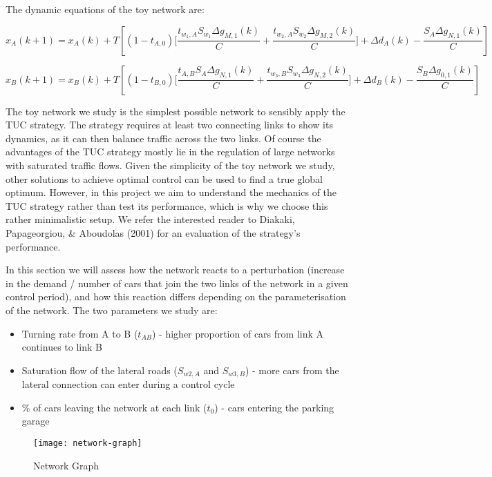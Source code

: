 \documentclass[11pt]{article}
\begin{document}
The dynamic equations of the toy network are:

\begin{equation}
x_{A}(k+1)=x_{A}(k)+T\left[\left(1-t_{A,0}\right)\bigg[\frac{t_{w_{1},A}S_{w_{1}}\Delta g_{M,1}(k)}{C}+\frac{t_{w_{2},A}S_{w_{2}}\Delta g_{M,2}(k)}{C}\bigg]+\Delta d_{A}(k)-\frac{S_{A}\Delta g_{N,1}(k)}{C}\right]
\end{equation}

\begin{equation}
x_{B}(k+1)=x_{B}(k)+T\left[\left(1-t_{B,0}\right)\bigg[\frac{t_{A,B}S_{A}\Delta g_{N,1}(k)}{C}+\frac{t_{w_{3},B}S_{w_{3}}\Delta g_{N,2}(k)}{C}\bigg]+\Delta d_{B}(k)-\frac{S_{B}\Delta g_{0,1}(k)}{C}\right]
\end{equation}


The toy network we study is the simplest possible network to sensibly apply the TUC strategy. The strategy requires at least two connecting links to show its dynamics, as it can then balance traffic across the two links. Of course the advantages of the TUC strategy mostly lie in the regulation of large networks with saturated traffic flows. Given the simplicity of the toy network we study, other solutions to achieve optimal control can be used to find a true global optimum. However, in this project we aim to understand the mechanics of the TUC strategy rather than test its performance, which is why we choose this rather minimalistic setup. We refer the interested reader to Diakaki, Papageorgiou, \& Aboudolas (2001) for an evaluation of the strategy's performance.

In this section we will assess how the network reacts to a perturbation (increase in the demand / number of cars that join the two links of the network in a given control period), and how this reaction differs depending on the parameterisation of the network. The two parameters we study are:

\begin{itemize}
\item Turning rate from A to B ($t_{AB}$) - higher proportion of cars from link A continues to link B
\item Saturation flow of the lateral roads ($S_{w2,A}$ and $S_{w3,B}$) - more cars from the lateral connection can enter during a control cycle
\item \% of cars leaving the network at each link ($t_0$) - cars entering the parking garage
\end{itemize}


\begin{figure}[h!]
    \caption{Network Graph}
      \centering
	\texttt{[image: network-graph]}
\end{figure}
\end{document}
